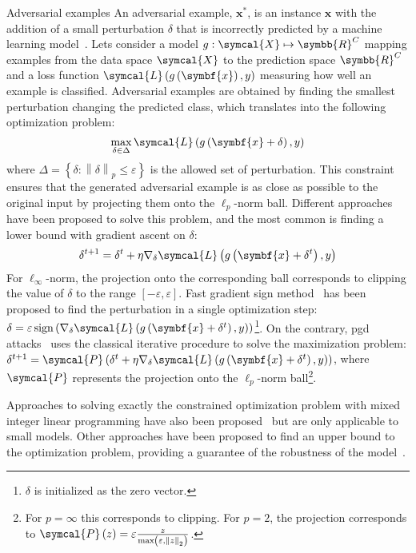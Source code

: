 \documentclass[../main.tex]{subfiles}
\begin{document}
	\begin{mybox}[label={box:adversarial}]{Adversarial examples}
	  An adversarial example, \(\symbf{x}^{\ast}\), is an instance \(\symbf{x}\) with the addition of a small perturbation \(\delta\) that is incorrectly predicted by a machine learning model~\cite{Szegedy2013IntriguingPO}.
	  Lets consider a model \(g:\symcal{X} \mapsto \symbb{R}^{C} \) mapping examples from the data space \(\symcal{X}\) to the prediction space \(\symbb{R}^{C}\) and a loss function \(\symcal{L}\left(g\left(\symbf{x}\right), y \right)\) measuring how well an example is classified.
	  Adversarial examples are obtained by finding the smallest perturbation changing the predicted class, which translates into the following optimization problem:
	  \[\max_{\delta \in \Delta} \symcal{L}\left(g\left(\symbf{x}+\delta\right), y \right)\]
	  where \(\Delta = \left\{\delta: \left\|\delta\right\|_{p} \leq \varepsilon \right\}\) is the allowed set of perturbation.
	  This constraint ensures that the generated adversarial example is as close as possible to the original input by projecting them onto the \(\ell_{p}\)-norm ball.
	  Different approaches have been proposed to solve this problem, and the most common is finding a lower bound with gradient ascent on \(\delta\):
	  \[\delta^{t+1} = \delta^{t} + \eta \nabla_{\delta}\symcal{L}\left(g\left(\symbf{x}+\delta^{t}\right), y \right)\]
	  For \(\ell_{\infty}\)-norm, the projection onto the corresponding ball corresponds to clipping the value of \(\delta\) to the range \(\left[-\varepsilon, \varepsilon\right]\).
	  Fast gradient sign method~\cite{FGSM} has been proposed to find the perturbation in a single optimization step: \(\delta = \varepsilon \operatorname{sign}\left(\nabla_{\delta}\symcal{L}\left(g\left(\symbf{x}+\delta^{t}\right), y \right)\right)\)\footnote{\(\delta\) is initialized as the zero vector.}.
	  On the contrary, \gls{pgd} attacks~\cite{PGDAttacks,PGDAttacks2} uses the classical iterative procedure to solve the maximization problem: \(\delta^{t+1} = \symcal{P}\left(\delta^{t} + \eta \nabla_{\delta}\symcal{L}\left(g\left(\symbf{x}+\delta^{t}\right), y \right)\right)\), where \(\symcal{P}\) represents the projection onto the \(\ell_{p}\)-norm ball\footnote{For \(p = \infty\) this corresponds to clipping. For \(p =2\), the projection corresponds to \(\symcal{P}\left(z\right) = \varepsilon \frac{z}{\max\left(\varepsilon, \left\|z\right\|_{2}\right)}\).}.%

	  Approaches to solving exactly the constrained optimization problem with mixed integer linear programming have also been proposed~\cite{tjeng2018evaluating} but are only applicable to small models.
	  Other approaches have been proposed to find an upper bound to the optimization problem, providing a guarantee of the robustness of the model~\cite{pmlr-v80-wong18a}.


\end{mybox}
\end{document}
